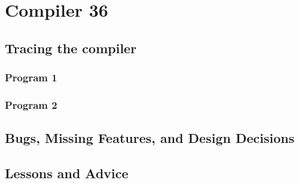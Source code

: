 	\chapter*{Compiler 36}

	\section{Tracing the compiler}

	\subsection{Program 1}

	\subsection{Program 2}

	\section{Bugs, Missing Features, and Design Decisions}

	\section{Lessons and Advice}


